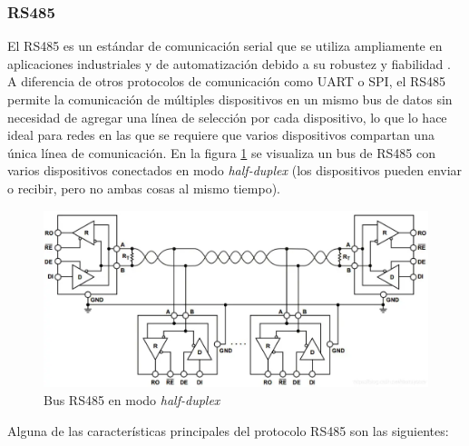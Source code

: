 \subsubsection{RS485}

El RS485 es un estándar de comunicación serial que se utiliza ampliamente en aplicaciones industriales y de automatización debido a su robustez y fiabilidad \cite{rs485}. A diferencia de otros protocolos de comunicación como UART o SPI, el RS485 permite la comunicación de múltiples dispositivos en un mismo bus de datos sin necesidad de agregar una línea de selección por cada dispositivo, lo que lo hace ideal para redes en las que se requiere que varios dispositivos compartan una única línea de comunicación. En la figura \ref{fig:res485} se visualiza un bus de RS485 con varios dispositivos conectados en modo \textit{half-duplex} (los dispositivos pueden enviar o recibir, pero no ambas cosas al mismo tiempo). \\ 

\begin{figure}[H]
    \centering
    \includegraphics[width =  \linewidth]{img/rs485.png}
    \caption{Bus RS485 en modo \textit{half-duplex}}
    \label{fig:res485}
\end{figure}

Alguna de las características principales del protocolo RS485 son las siguientes: 

